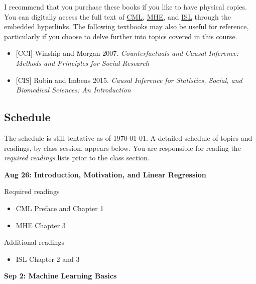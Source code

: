 \documentclass[12pt]{article}
\begin{document}
I recommend that you purchase these books if you like to have physical copies. You can digitally access the full text of \href{https://causalml-book.org/}{\textcolor{titlecolor}{CML}}, \href{https://www.dsecoaching.com/pdf/2008%20Angrist%20Pischke%20MostlyHarmlessEconometrics.pdf}{\textcolor{titlecolor}{MHE}}, and \href{https://www.statlearning.com/}{\textcolor{titlecolor}{ISL}} through the embedded hyperlinks. The following textbooks may also be useful for reference, particularly
if you choose to delve further into topics covered in this course.

\begin{itemize}[noitemsep]
    \item \textcolor{titlecolor}{[CCI]} Winship and Morgan 2007. \textit{Counterfactuals and Causal Inference: Methods and Principles for Social Research}
    \item \textcolor{titlecolor}{[CIS]}  Rubin and Imbens 2015. \textit{Causal Inference for Statistics, Social, and Biomedical Sciences: An Introduction}
\end{itemize}

\subsection*{Schedule}


The schedule is still tentative as of \today. A detailed schedule of topics and readings, by class session, appears below. You are responsible for reading the \textit{required readings} lists prior to the class section.

\vspace{1em}

\noindent \textbf{\textcolor{titlecolor}{Aug 26: Introduction, Motivation, and Linear Regression}}

\noindent Required readings
\begin{itemize}[noitemsep, topsep=2pt]
    \item CML Preface and Chapter 1
    \item MHE Chapter 3
\end{itemize}
\noindent Additional readings
\begin{itemize}
    \item ISL Chapter 2 and 3
\end{itemize}

\vspace{1em} \noindent \textbf{\textcolor{titlecolor}{Sep 2: Machine Learning Basics}}
\end{document}

